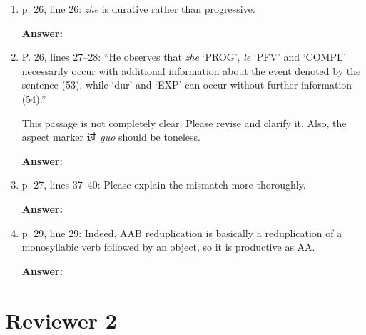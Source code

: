 \documentclass[fleqn,twoside]{article}
\begin{document}
\begin{enumerate}
\item p. 26, line 26: \textit{zhe} is durative rather than progressive.

\noindent
\textbf{Answer:}

\item P. 26, lines 27--28: ``He observes that \textit{zhe} `PROG', \textit{le} `PFV' and  `COMPL' necessarily occur
with additional information about the event denoted by the sentence (53), while  `dur' and 
`EXP' can occur without further information (54).''

This passage is not completely clear. Please revise and clarify it. Also, the aspect marker 过 \textit{guo}
should be toneless.

\noindent
\textbf{Answer:}

\item p. 27, lines 37--40: Pleasc explain the mismatch more thoroughly.

\noindent
\textbf{Answer:}

\item p. 29, line 29: Indeed, AAB reduplication is basically a reduplication of a monosyllabic verb followed
by an object, so it is productive as AA.

\noindent
\textbf{Answer:}


\end{enumerate}

\section{Reviewer 2}\label{sec:2}
\end{document}
